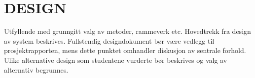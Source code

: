 \chapter{DESIGN}
Utfyllende med grunngitt valg av metoder, rammeverk etc.
Hovedtrekk fra design av system beskrives. Fullstendig designdokument bør være vedlegg til
prosjektrapporten, mens dette punktet omhandler diskusjon av sentrale forhold. Ulike alternative
design som studentene vurderte bør beskrives og valg av alternativ begrunnes.